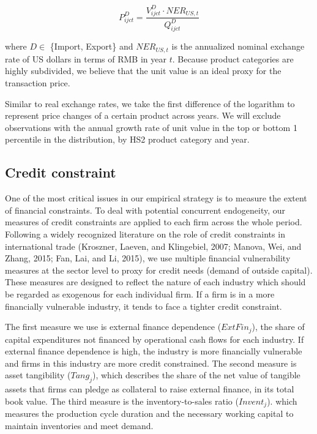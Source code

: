 $$
P^{D}_{ijct}=\frac{V^{D}_{ijct}\cdot NER_{US,t}}{Q^{D}_{ijct}}
$$

where $D \in$ \{Import, Export\} and $NER_{US,t}$ is the annualized nominal exchange rate of US dollars in terms of RMB in year $t$. Because product categories are highly subdivided, we believe that the unit value is an ideal proxy for the transaction price.

Similar to real exchange rates, we take the first difference of the logarithm to represent price changes of a certain product across years. We will exclude observations with the annual growth rate of unit value in the top or bottom 1 percentile in the distribution, by HS2 product category and year.

\subsection{Credit constraint}\label{sec-4.2.2}

One of the most critical issues in our empirical strategy is to measure the extent of financial constraints. To deal with potential concurrent endogeneity, our measures of credit constraints are applied to each firm across the whole period. Following a widely recognized literature on the role of credit constraints in international trade (Kroszner, Laeven, and Klingebiel, 2007\cite{kroszner2007}; Manova, Wei, and Zhang, 2015\cite{manova-wei-zhang2015}; Fan, Lai, and Li, 2015\cite{fan-lai-li2015}), we use multiple financial vulnerability measures at the sector level to proxy for credit needs (demand of outside capital). These measures are designed to reflect the nature of each industry which should be regarded as exogenous for each individual firm. If a firm is in a more financially vulnerable industry, it tends to face a tighter credit constraint.

The first measure we use is external finance dependence ($ExtFin_j$), the share of capital expenditures not financed by operational cash flows for each industry. If external finance dependence is high, the industry is more financially vulnerable and firms in this industry are more credit constrained.  The second measure is asset tangibility ($Tang_j$), which describes the share of the net value of tangible assets that firms can pledge as collateral to raise external finance, in its total book value. The third measure is the inventory-to-sales ratio ($Invent_j$). which measures the production cycle duration and the necessary working capital to maintain inventories and meet demand. 

